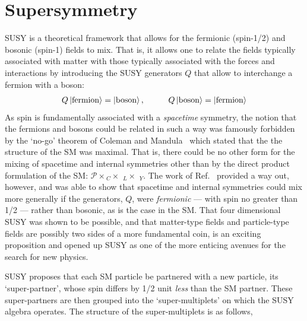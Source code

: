 \section{Supersymmetry}
\label{sec:susy}

SUSY is a theoretical framework that allows for the fermionic (spin-1/2) and bosonic (spin-1)
fields to mix.
That is, it allows one to relate the fields typically associated with matter with those
typically associated with the forces and interactions by introducing the SUSY generators $Q$ that
allow to interchange a fermion with a boson:
\begin{align}
    Q \ket{\text{fermion}} = \ket{\text{boson}}, \hspace{1cm} Q \ket{\text{boson}} = \ket{\text{fermion}}
    \label{eq:susy_operator}
\end{align}
As spin is fundamentally associated with a \textit{spacetime} symmetry, the notion 
that the fermions and bosons could be related in such a way was famously forbidden
by the `no-go' theorem of Coleman and Mandula~\cite{ColemanMandula} which stated that the
the structure
of the SM was maximal.
That is, there could be no other form for the mixing of spacetime and internal
symmetries other than by the direct product formulation of the SM: $\mathcal{P} \times$\SUthree$_C \times $ \SUtwo$_L \times$ \Uone$_{Y}$.
The work of Ref.~\cite{HaagSUSY} provided a way out, however, and was able to show
that spacetime and internal symmetries could mix more generally if the generators, $Q$, were \textit{fermionic} --- with spin no greater than 1/2 --- rather than
bosonic, as is the case in the SM.
That four dimensional SUSY was shown to be possible, and that matter-type fields and particle-type fields
are possibly two sides of a more fundamental coin, is an exciting proposition and opened
up SUSY as one of the more enticing avenues for the search for new physics.

SUSY proposes that each SM particle be partnered with a new particle, its `super-partner', whose spin differs
by 1/2 unit \textit{less} than the SM partner.
These super-partners are then grouped into the `super-multiplets'
on which the SUSY algebra operates.
The structure of the super-multiplets is as follows,

